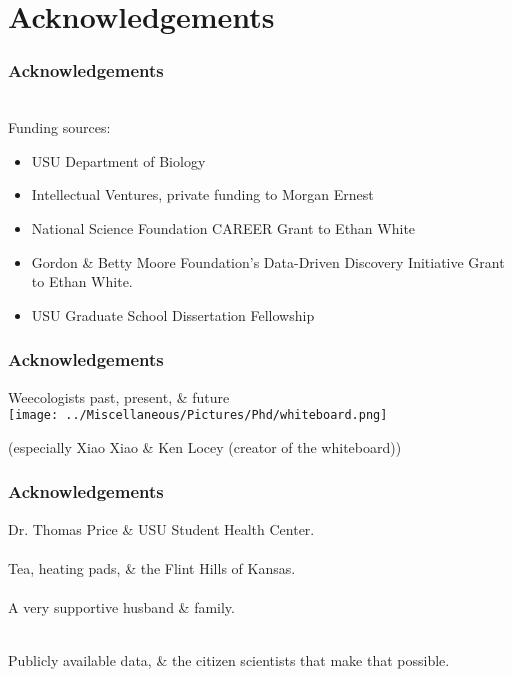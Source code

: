 \documentclass[14pt]{beamer}
\begin{document}
\section{Acknowledgements}
\begin{frame}[t]{}
\frametitle{Acknowledgements}
~\\ %
\small{Funding sources:}
\begin{small}
\begin{itemize}
\item USU Department of Biology
\item Intellectual Ventures, private funding to Morgan Ernest
\item National Science Foundation CAREER Grant to Ethan White
\item Gordon \& Betty Moore Foundation's Data-Driven Discovery Initiative Grant to Ethan White.
\item USU Graduate School Dissertation Fellowship
\end{itemize}
\end{small}
\end{frame}

\begin{frame}{}
\frametitle{Acknowledgements}
Weecologists past, present, \& future\\
\texttt{[image: ../Miscellaneous/Pictures/Phd/whiteboard.png]}
\begin{tiny}
(especially Xiao Xiao \& Ken Locey (creator of the whiteboard))
\end{tiny}
\end{frame}

\begin{frame}[t]{}
\frametitle{Acknowledgements}
Dr. Thomas Price \& USU Student Health Center.\\
~\\
Tea, heating pads, \& the Flint Hills of Kansas.\\
~\\
A very supportive husband \& family.\\
~\\
\begin{Large}
Publicly available data, \& the citizen scientists that make that possible.\\
\end{Large}
\end{frame}
\end{document}
